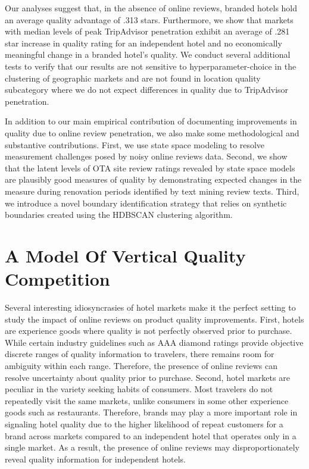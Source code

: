 \documentclass[mksc,blindrev]{informs3} %
\begin{document}
Our analyses suggest that, in the absence of online reviews, branded hotels hold an average quality advantage of .313 stars. Furthermore, we show that markets with median levels of peak TripAdvisor penetration exhibit an average of .281 star increase in quality rating for an independent hotel and no economically meaningful change in a branded hotel's quality. We conduct several additional tests to verify that our results are not sensitive to hyperparameter-choice in the clustering of geographic markets and are not found in location quality subcategory where we do not expect differences in quality due to TripAdvisor penetration.

In addition to our main empirical contribution of documenting improvements in quality due to online review penetration, we also make some methodological and substantive contributions. First, we use state space modeling to resolve measurement challenges posed by noisy online reviews data. Second, we show that the latent levels of OTA site review ratings revealed by state space models are plausibly good measures of quality by demonstrating expected changes in the measure during renovation periods identified by text mining review texts. Third, we introduce a novel boundary identification strategy that relies on synthetic boundaries created using the HDBSCAN clustering algorithm. 




\section{A Model Of Vertical Quality Competition} \label{sec:theory}

Several interesting idiosyncrasies of hotel markets make it the perfect setting to study the impact of online reviews on product quality improvements. First, hotels are experience goods where quality is not perfectly observed prior to purchase. While certain industry guidelines such as AAA diamond ratings provide objective discrete ranges of quality information to travelers, there remains room for ambiguity within each range. Therefore, the presence of online reviews can resolve uncertainty about quality prior to purchase. Second, hotel markets are peculiar in the variety seeking habits of consumers. Most travelers do not repeatedly visit the same markets, unlike consumers in some other experience goods such as restaurants. Therefore, brands may play a more important role in signaling hotel quality due to the higher likelihood of repeat customers for a brand across markets compared to an independent hotel that operates only in a single market. As a result, the presence of online reviews may disproportionately reveal quality information for independent hotels.
\end{document}
